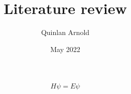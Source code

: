\documentclass[12pt]{report}
\title{Literature review}
\author{Quinlan Arnold}
\date{May 2022}
\begin{document}



\setlength{\parindent}{0pt}
\setlength{\parskip}{10pt}

\maketitle

\setcounter{tocdepth}{1}


\tableofcontents

\begin{align} 
    H\psi = E\psi 
\end{align}



%

%

%

%





\end{document}
